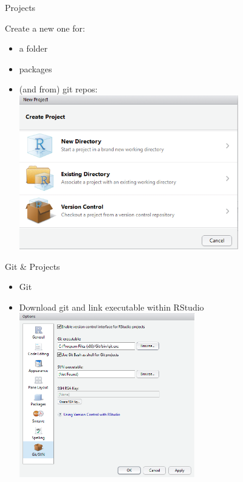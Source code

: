 \documentclass[
  ignorenonframetext,
]{beamer}
\providecommand{\tightlist}{%
  \setlength{\itemsep}{0pt}\setlength{\parskip}{0pt}}
\begin{document}
\begin{frame}{Projects}
\protect\hypertarget{projects}{}

Create a new one for:

\begin{itemize}
\tightlist
\item
  a folder
\item
  packages
\item
  (and from) git repos:
  \includegraphics[width=0.75\textwidth,height=\textheight]{../external/images/setup_2_rstudio_project.PNG}
\end{itemize}

\end{frame}

\begin{frame}{Git \& Projects}
\protect\hypertarget{git-projects}{}

\begin{itemize}
\tightlist
\item
  Git
\item
  Download git and link executable within RStudio
  \includegraphics[width=0.6\textwidth,height=\textheight]{../external/images/setup_1_rstudio_git.PNG}
\end{itemize}

\end{frame}
\end{document}
